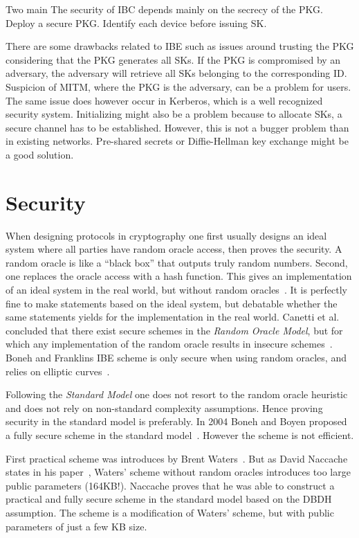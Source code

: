 Two main
The security of \gls{IBC} depends mainly on the secrecy of the \gls{PKG}.
Deploy a secure \gls{PKG}.
Identify each device before issuing \gls{SK}.

There are some drawbacks related to \gls{IBE} such as issues around trusting the \gls{PKG} considering that the \gls{PKG} generates all \gls{SK}s.  
If the \gls{PKG} is compromised by an adversary, the adversary will retrieve all \gls{SK}s belonging to the corresponding \gls{ID}. 
Suspicion of \gls{MITM}, where the \gls{PKG} is the adversary, can be a problem for users.
The same issue does however occur in Kerberos, which is a well recognized security system.
Initializing might also be a problem because to allocate \gls{SK}s, a secure channel has to be established. 
However, this is not a bugger problem than in existing networks. 
Pre-shared secrets or Diffie-Hellman key exchange might be a good solution.

\section{Security}\label{ibe-secureness}
When designing protocols in cryptography one first usually designs an ideal system where all parties have random oracle access, then proves the security.
A random oracle is like a ``black box'' that outputs truly random numbers.
Second, one replaces the oracle access with a hash function.
This gives an implementation of an ideal system in the real world, but without random oracles~\cite{DBLP:conf/ccs/BellareR93}. 
It is perfectly fine to make statements based on the ideal system, but debatable whether the same statements yields for the implementation in the real world.
Canetti et al. concluded that there exist secure schemes in the \textit{Random Oracle Model}, but for which any implementation of the random oracle results in insecure schemes~\cite{DBLP:journals/jacm/CanettiGH04}.
Boneh and Franklins \gls{IBE} scheme is only secure when using random oracles, and relies on elliptic curves~\cite{DBLP:conf/crypto/BonehF01}.

Following the \textit{Standard Model} one does not resort to the random oracle heuristic and does not rely on non-standard complexity assumptions.
Hence proving security in the standard model is preferably.
In 2004 Boneh and Boyen proposed a fully secure scheme in the standard model~\cite{DBLP:conf/crypto/BonehB04}.
However the scheme is not efficient. 

First practical scheme was introduces by Brent Waters~\cite{DBLP:journals/iacr/Waters04}.
But as David Naccache states in his paper~\cite{DBLP:journals/iacr/Naccache05}, Waters' scheme without random oracles introduces too large public parameters (164\gls{KB}!).
Naccache proves that he was able to construct a practical and fully secure scheme in the standard model based on the \gls{DBDH} assumption.
The scheme is a modification of Waters' scheme, but with public parameters of just a few \gls{KB} size.

